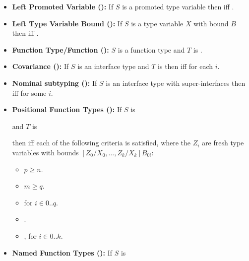 \documentclass[makeidx]{article}
\begin{document}
{\begin{itemize}
\begin{itemize}
  \end{itemize}
\item
  \textbf{Left Promoted Variable (\SrnLeftPromotedVariableTwo):}
  If $S$ is a promoted type variable 
  then  if{}f .
\item
  \textbf{Left Type Variable Bound (\SrnLeftVariableBound):}
  If $S$ is a type variable $X$ with bound $B$
  then  if{}f .
\item
  \textbf{Function Type/Function (\SrnRightFunction):}
  $S$ is a function type and $T$ is \FUNCTION.
\item
  \textbf{Covariance (\SrnCovariance):}
  If $S$ is an interface type 
  and $T$ is 
  then  if{}f  for each $i$.
\item
  \textbf{Nominal subtyping (\SrnNominal):}
  If $S$ is an interface type with super-interfaces 
  then  if{}f  for some $i$.
\item
  \textbf{Positional Function Types (\SrnPositionalFunctionType):}
  If $S$ is


  and $T$ is


  then  if{}f each of the following criteria is satisfied,
  where the $Z_i$ are fresh type variables with bounds
  $[Z_0/X_0, \ldots, Z_k/X_k]B_{0i}$:

  \begin{itemize}
  \item $p \geq n$.
  \item $m \geq q$.
  \item {}
    for $i \in 0 .. q$.
  \item {}.
  \item
    ,
    for $i \in 0 .. k$.
  \end{itemize}
\item
  \textbf{Named Function Types (\SrnNamedFunctionType):}
  If $S$ is


\end{itemize}}
\end{document}
